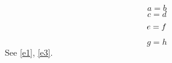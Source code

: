 \documentclass{article}
\begin{document}
\begin{equation}a=b\label{e1}\end{equation}
\begin{equation}c=d\nonumber\end{equation}
\begin{equation}e=f\notag\end{equation}
\begin{equation}g=h\label{e3}\end{equation}
See \ref{e1}, \ref{e3}.
\end{document}
